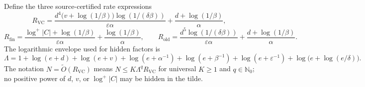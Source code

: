 Define the three source-certified rate expressions
\[
 R_{\mathrm{VC}}=
 \frac{d^4\bigl(v+\log(1/\beta)\bigr)\log(1/(\delta\beta))}
      {\varepsilon\alpha}
 +\frac{d+\log(1/\beta)}{\alpha},
\]
\[
 R_{\mathrm{fin}}=
 \frac{\log^+|C|+\log(1/\beta)}{\varepsilon\alpha}
 +\frac{\log(1/\beta)}{\alpha},\qquad
 R_{\mathrm{old}}=
 \frac{d^5\log(1/(\delta\beta))}{\varepsilon\alpha}
 +\frac{d+\log(1/\beta)}{\alpha}.
\]
The logarithmic envelope used for hidden factors is
\[
\Lambda=1+\log(e+d)+\log(e+v)+\log(e+\alpha^{-1})
 +\log(e+\beta^{-1})+\log(e+\varepsilon^{-1})
 +\log\!\bigl(e+\log(e/\delta)\bigr).
\]
The notation $N=\widetilde O(R_{\mathrm{VC}})$ means
$N\le K\Lambda^qR_{\mathrm{VC}}$ for universal $K\ge1$ and
$q\in\mathbb N_0$; no positive power of $d$, $v$, or $\log^+|C|$ may be
hidden in the tilde.
